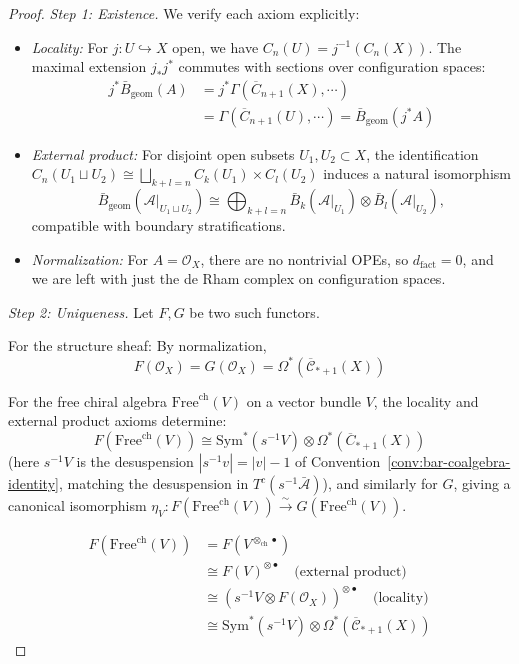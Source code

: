 \begin{proof}
\emph{Step 1: Existence.} We verify each axiom explicitly:
\begin{itemize}
\item \emph{Locality:} For $j: U \hookrightarrow X$ open,
we have $C_n(U) = j^{-1}(C_n(X))$.
The maximal extension $j_*j^*$ commutes with sections over
configuration spaces:
\begin{align*}
j^*\bar{B}_{\text{geom}}(A)
&= j^*\Gamma(\overline{C}_{n+1}(X), \cdots) \\
&= \Gamma(\overline{C}_{n+1}(U), \cdots)
= \bar{B}_{\text{geom}}(j^*A)
\end{align*}

\item \emph{External product:} For disjoint open subsets
$U_1, U_2 \subset X$, the identification
$C_n(U_1 \sqcup U_2) \cong
\bigsqcup_{k+l=n} C_k(U_1) \times C_l(U_2)$
induces a natural isomorphism
\[
\bar{B}_{\mathrm{geom}}(\mathcal{A}|_{U_1 \sqcup U_2})
\cong \bigoplus_{k+l=n}
\bar{B}_k(\mathcal{A}|_{U_1}) \otimes
\bar{B}_l(\mathcal{A}|_{U_2}),
\]
compatible with boundary stratifications.

\item \emph{Normalization:} For $A = \mathcal{O}_X$, there are no nontrivial OPEs, so
$d_{\text{fact}} = 0$, and we are left with just the de Rham complex on configuration spaces.
\end{itemize}

\emph{Step 2: Uniqueness.} Let $F, G$ be two such functors.

For the structure sheaf: By normalization,
\[F(\mathcal{O}_X) = G(\mathcal{O}_X) = \Omega^*(\overline{\mathcal{C}}_{*+1}(X))\]

For the free chiral algebra $\text{Free}^{\text{ch}}(V)$ on a vector bundle $V$, the locality and external product axioms determine:
\[F(\text{Free}^{\text{ch}}(V)) \cong \text{Sym}^*(s^{-1}V) \otimes \Omega^*(\overline{C}_{*+1}(X))\]
(here $s^{-1}V$ is the desuspension $|s^{-1}v| = |v| - 1$ of Convention~\ref{conv:bar-coalgebra-identity}, matching the desuspension in $T^c(s^{-1}\bar{\mathcal{A}})$), and similarly for $G$, giving a canonical isomorphism $\eta_V\colon F(\text{Free}^{\text{ch}}(V)) \xrightarrow{\sim} G(\text{Free}^{\text{ch}}(V))$.


\begin{align}
F(\text{Free}^{\text{ch}}(V)) &= F(V^{\otimes_{\text{ch}} \bullet})\\
&\cong F(V)^{\otimes \bullet} \quad \text{(external product)}\\
&\cong (s^{-1}V \otimes F(\mathcal{O}_X))^{\otimes \bullet} \quad \text{(locality)}\\
&\cong \text{Sym}^*(s^{-1}V) \otimes \Omega^*(\overline{\mathcal{C}}_{*+1}(X))
\end{align}


\end{proof}
